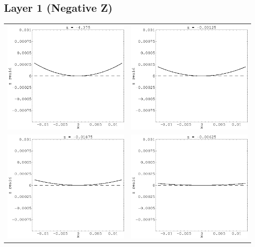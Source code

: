 \documentclass[12pt]{article}
\begin{document}
\subsection*{Layer 1 (Negative Z)}
  \begin{tabular}{c c}
    \includegraphics[width=7.3 cm]{layer1_right4.eps} &
    \includegraphics[width=7.3 cm]{layer1_right3.eps} \\
    \includegraphics[width=7.3 cm]{layer1_right2.eps} &
    \includegraphics[width=7.3 cm]{layer1_right1.eps} \\
  \end{tabular}
\end{document}
